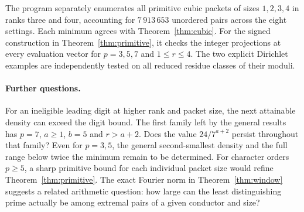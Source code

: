 \documentclass[11pt,letterpaper]{article}
\theoremstyle{remark}
\begin{document}
The program separately enumerates all primitive cubic packets of sizes
$1,2,3,4$ in ranks three and four, accounting for $7\,913\,653$ unordered
pairs across the eight settings. Each minimum agrees with
Theorem~\ref{thm:cubic}. For the signed construction in
Theorem~\ref{thm:primitive}, it checks the integer projections at every
evaluation vector for $p=3,5,7$ and $1\le r\le4$. The two explicit
Dirichlet examples are independently tested on all reduced residue
classes of their moduli.

\paragraph{Further questions.}
For an ineligible leading digit at higher rank and packet size,
the next attainable density can exceed the digit bound. The first
family left by the general results has $p=7$, $a\ge1$, $b=5$ and
$r>a+2$. Does the value $24/7^{a+2}$ persist throughout that family?
Even for $p=3,5$, the general second-smallest density and the full
range below twice the minimum remain to be determined. For character orders $p\ge5$, a sharp primitive bound for each individual packet size would refine Theorem~\ref{thm:primitive}. The exact
Fourier norm in Theorem~\ref{thm:window} suggests a related arithmetic
question: how large can the least distinguishing prime actually be
among extremal pairs of a given conductor and size?
\end{document}
